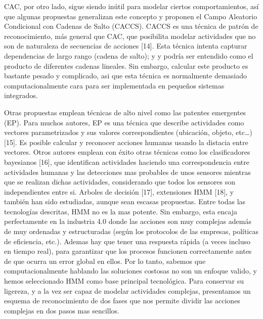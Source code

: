 \documentclass[a4paper]{article}
\begin{document}
\begin{center}
    
CAC, por otro lado, sigue siendo inútil para modelar ciertos comportamientos, así que algunas propuestas generalizan este concepto y proponen el Campo Aleatorio Condicional con Cadenas de Salto
(CACCS). CACCS es una técnica de patrón de reconocimiento, más general que CAC, que posibilita modelar actividades que no son de naturaleza de secuencias de acciones [14]. Esta técnica intenta capturar dependencias de largo rango (cadena de salto); y y podría ser entendido como el producto de diferentes cadenas lineales. Sin embargo, calcular este producto es bastante pesado y complicado, asi que esta técnica es normalmente demasiado computacionalmente cara para ser implementada en pequeños sistemas integrados.
\end{center}
Otras propuestas emplean técnicas de alto nivel como las patentes emergentes (EP). Para muchos autores, EP es una técnica que describe actividades como vectores parametrizados y sus valores correspondientes (ubicación, objeto, etc…) [15]. Es posible calcular y reconocer acciones humanas usando la distacia entre vectores. Otros autores emplean con éxito otras técnicas como los clasificadores bayesianos [16], que identifican actividades haciendo una correspondencia entre actividades humanas y las detecciones mas probables de unos sensores mientras que se realizan dichas actividades, considerando que todos los sensores son independientes entre si. Arboles de decisión [17], extensiones HMM [18], y también han sido estudiadas, aunque sean escasas propuestas. 
Entre todas las tecnologías descritas, HMM no es la mas potente. Sin embargo, esta encaja perfectamente en la industria 4.0 donde las acciones son muy complejas además de muy ordenadas y estructuradas (según los protocolos de las empresas, políticas de eficiencia, etc.). Ademas hay que tener una respuesta rápida (a veces incluso en tiempo real), para garantizar que los procesos funcionen correctamente antes de que ocurra un error global en ellos. Por lo tanto, sabemos que computacionalmente hablando las soluciones costosas no son un enfoque valido, y hemos seleccionado HMM como base principal tecnológica. Para conservar su ligereza, y a la vez ser capaz de modelar actividades complejas, presentamos un esquema de reconocimiento de dos fases que nos permite dividir las acciones complejas en dos pasos mas sencillos.
\end{document}
